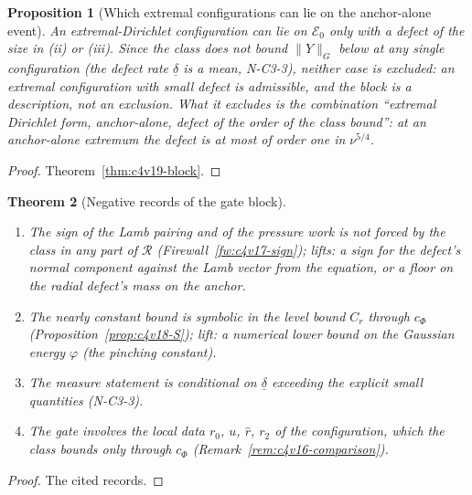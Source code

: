\documentclass[11pt]{article}
\theoremstyle{plain}
\newtheorem{theorem}{Theorem}[section]
\newtheorem{proposition}[theorem]{Proposition}
\theoremstyle{definition}
\theoremstyle{remark}
\begin{document}
\begin{proposition}[Which extremal configurations can lie on the anchor-alone event]
\label{prop:c4v19-which}
An extremal-Dirichlet configuration can lie on \(\mathcal E_0\) only with a
defect of the size in (ii) or (iii).  Since the class does not bound
\(\|Y\|_G\) below at any single configuration (the defect rate \(\underline\delta\) is a
mean, N-C3-3), neither case is excluded: an extremal configuration
with small defect is admissible, and the block is a description, not
an exclusion.  What it excludes is the combination ``extremal
Dirichlet form, anchor-alone, defect of the order of the class
bound'': at an anchor-alone extremum the defect is at most of order
one in \(\nu^{5/4}\).
\end{proposition}

\begin{proof}
Theorem~\ref{thm:c4v19-block}.
\end{proof}

\begin{theorem}[Negative records of the gate block]
\label{thm:c4v19-negatives}
\begin{enumerate}[label=\textup{(N\arabic*)},leftmargin=3.6em]
\item The sign of the Lamb pairing and of the pressure work is not
      forced by the class in any part of \(\mathcal R\) (Firewall~\ref{fw:c4v17-sign});
      lifts: a sign for the defect's normal component against the
      Lamb vector from the equation, or a floor on the radial
      defect's mass on the anchor.
\item The nearly constant bound is symbolic in the level bound \(C_r\)
      through \(c_\Phi\) (Proposition~\ref{prop:c4v18-S}); lift: a numerical
      lower bound on the Gaussian energy \(\varphi\) (the pinching constant).
\item The measure statement is conditional on \(\underline\delta\) exceeding the
      explicit small quantities (N-C3-3).
\item The gate involves the local data \(r_0\), \(u\), \(\hat r\), \(r_2\) of the
      configuration, which the class bounds only through \(c_\Phi\)
      (Remark~\ref{rem:c4v16-comparison}).
\end{enumerate}
\end{theorem}

\begin{proof}
The cited records.
\end{proof}

\end{document}
